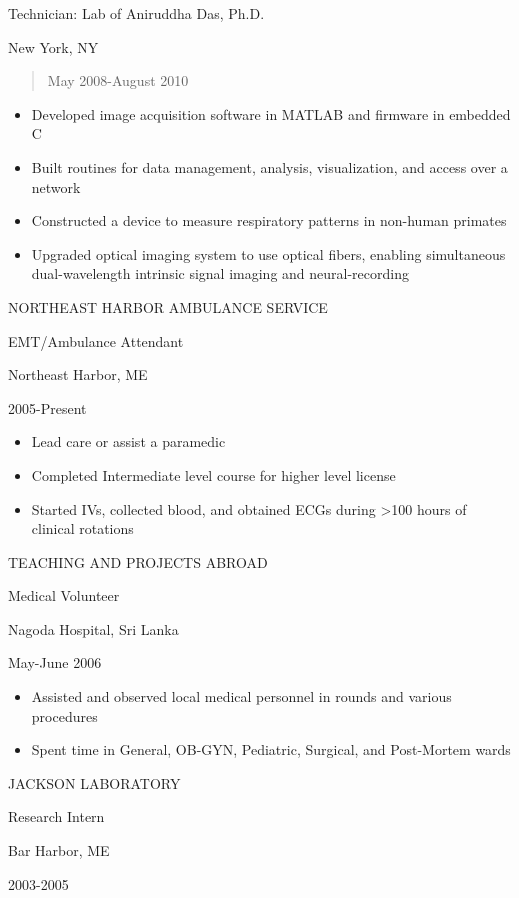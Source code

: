 Technician: Lab of Aniruddha Das, Ph.D.

New York, NY 

\begin{quote}
	May 2008-August 2010
\end{quote}

\begin{itemize}
	\item Developed image acquisition software in MATLAB and firmware in embedded C
	\item Built routines for data management, analysis, visualization, and access over a network
	\item Constructed a device to measure respiratory patterns in non-human primates
	\item Upgraded optical imaging system to use optical fibers, enabling simultaneous dual-wavelength intrinsic signal imaging and neural-recording
\end{itemize}

NORTHEAST HARBOR AMBULANCE SERVICE 

EMT/Ambulance Attendant 

Northeast Harbor, ME 

2005-Present 

\begin{itemize}
	\item Lead care or assist a paramedic
	\item Completed Intermediate level course for higher level license
	\item Started IVs, collected blood, and obtained ECGs during \textgreater100 hours of clinical rotations
\end{itemize}

TEACHING AND PROJECTS ABROAD 

Medical Volunteer 

Nagoda Hospital, Sri Lanka 

May-June 2006 

\begin{itemize}
	\item Assisted and observed local medical personnel in rounds and various procedures
	\item Spent time in General, OB-GYN, Pediatric, Surgical, and Post-Mortem wards
\end{itemize}

JACKSON LABORATORY 

Research Intern 

Bar Harbor, ME 

2003-2005 

